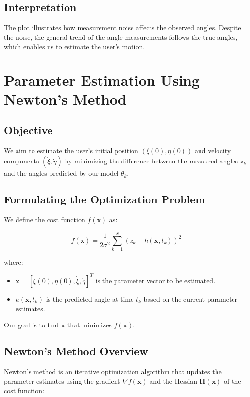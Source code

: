 \documentclass[12pt]{article}
\begin{document}
\subsection{Interpretation}

The plot illustrates how measurement noise affects the observed angles. Despite the noise, the general trend of the angle measurements follows the true angles, which enables us to estimate the user's motion.

\section{Parameter Estimation Using Newton's Method}

\subsection{Objective}

We aim to estimate the user's initial position \( (\xi(0), \eta(0)) \) and velocity components \( (\dot{\xi}, \dot{\eta}) \) by minimizing the difference between the measured angles \( z_k \) and the angles predicted by our model \( \theta_k \).

\subsection{Formulating the Optimization Problem}

We define the cost function \( f(\mathbf{x}) \) as:

\[
f(\mathbf{x}) = \frac{1}{2\sigma^2} \sum_{k=1}^{N} \left( z_k - h(\mathbf{x}, t_k) \right)^2
\]

where:

\begin{itemize}
    \item \( \mathbf{x} = [\xi(0), \eta(0), \dot{\xi}, \dot{\eta}]^T \) is the parameter vector to be estimated.
    \item \( h(\mathbf{x}, t_k) \) is the predicted angle at time \( t_k \) based on the current parameter estimates.
\end{itemize}

Our goal is to find \( \mathbf{x} \) that minimizes \( f(\mathbf{x}) \).

\subsection{Newton's Method Overview}

Newton's method is an iterative optimization algorithm that updates the parameter estimates using the gradient \( \nabla f(\mathbf{x}) \) and the Hessian \( \mathbf{H}(\mathbf{x}) \) of the cost function:
\end{document}
